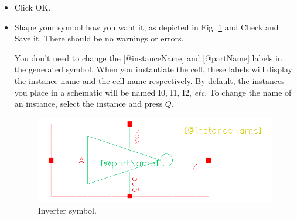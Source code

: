 \begin{enumerate}
\begin{itemize}
		\item Click OK.
		\item Shape your symbol how you want it, as depicted in Fig. \ref{fig_invsymbol} and Check and Save it. There should be no warnings or errors. 
		\begin{remark}
			You don’t need to change the $[$@instanceName$]$ and $[$@partName$]$ labels in the generated symbol. When you instantiate the cell, these labels will display the instance name and the cell name respectively. By default, the instances you place in a schematic will be named I0, I1, I2, \textit{etc}. To change the name of an instance, select the instance and press $Q$.
			
		\end{remark}
		
		\begin{figure}[!h]
			\centering
			\includegraphics[scale=0.45]{figures/lab1_schematic_sim/inv_symbol}
			\caption{Inverter symbol.}
			\label{fig_invsymbol}
		\end{figure}
	\end{itemize} 
	
\end{enumerate} 
\clearpage
